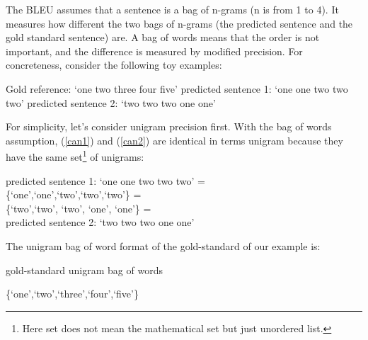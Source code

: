 \documentclass[final]{ua-thesis}
\numberwithin{equation}{section}
\begin{document}
The BLEU assumes that a sentence is a bag of n-grams (n is from 1 to 4). It measures how different the two bags of n-grams (the predicted sentence and the gold standard sentence) are. A bag of words means that the order is not important, and the difference is measured by modified precision. For concreteness, consider the following toy examples:

\begin{exe}
\ex 
	\begin{xlist}
	\ex \label{gold1} Gold reference: `one two three four five'
	\ex \label{can1} predicted sentence 1: `one one two two two'
	\ex \label{can2} predicted sentence 2: `two two two one one'
	\end{xlist}
\end{exe}

For simplicity, let's consider unigram precision first. With the bag of words assumption, (\ref{can1}) and (\ref{can2}) are identical in terms unigram because they have the same set\footnote{Here set does not mean the mathematical set but just unordered list.} of unigrams:   

\begin{exe}
\ex 
	\begin{xlist}
	\ex predicted sentence 1: `one one two two two' =\\
	 \{`one',`one',`two',`two',`two'\}  =\\
	 \{`two',`two', `two', `one', `one'\} =\\
	  predicted sentence 2: `two two two one one'
	\end{xlist}
\end{exe}

The unigram bag of word format of the gold-standard of our example is:

\begin{exe}
\ex gold-standard unigram bag of words
	\begin{xlist}
	\ex \{`one',`two',`three',`four',`five'\}
	\end{xlist}
\end{exe}
\end{document}
